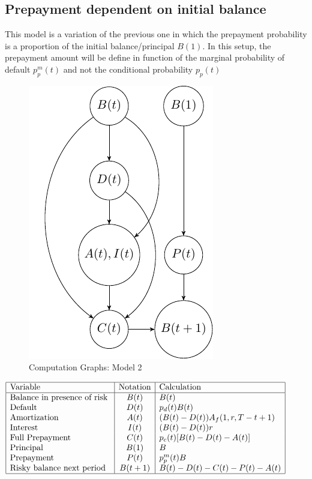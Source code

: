 \subsection{Prepayment dependent on initial balance}
This model is a variation of the previous one in which the prepayment probability is a proportion of the initial balance/principal $B(1)$. In this setup, the prepayment amount will be define in function of the marginal probability of default $p^m_p(t)$ and not the conditional probability $p_p(t)$ 
\begin{figure}[H]
  \centering
      \includegraphics[width=.3\textwidth]{Graph1.pdf} 
 \caption{Computation Graphs: Model 2}
 \label{fig:Test}
\end{figure}

\begin{center} %
\begin{math}
\begin{array}{|l|c|l|} \hline %
\mbox{Variable} &\mbox{Notation} & \mbox{Calculation}\\ \hline
\mbox{Balance in presence of risk }  & B(t)  & B(t)\\
\mbox{Default  }  & D(t) & p_d(t) B(t)\\
\mbox{Amortization}  & A(t) &(B(t)-D(t)) A_f(1,r,T-t+1)\\
\mbox{Interest }  &  I(t) & (B(t)-D(t))r\\
\mbox{Full Prepayment}  & C(t) & p_c(t) [B(t)-D(t)-A(t)]\\
\mbox{Principal   }  &  B(1) & B\\
\mbox{Prepayment  }  & P(t) & p_p^m(t)B\\
\mbox{Risky balance next period  }  & B(t+1) & B(t)-D(t)-C(t)-P(t)-A(t)\\
\hline
\end{array} %
\end{math}
\end{center}

